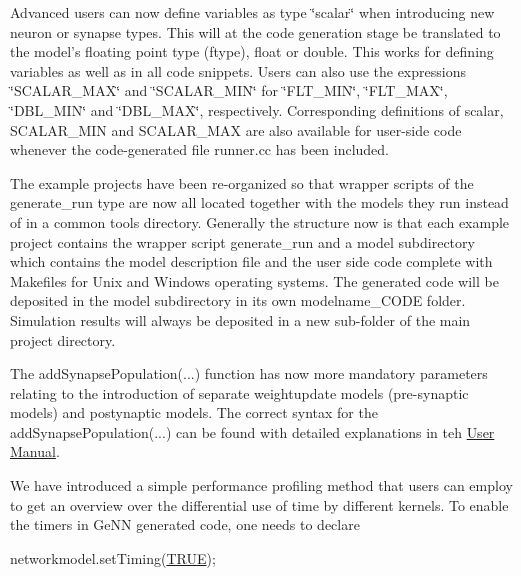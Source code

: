 \begin{DoxyEnumerate}
\item Advanced users can now define variables as type \char`\"{}scalar\char`\"{} when introducing new neuron or synapse types. This will at the code generation stage be translated to the model's floating point type (ftype), {\ttfamily float} or {\ttfamily double}. This works for defining variables as well as in all code snippets. Users can also use the expressions \char`\"{}\+S\+C\+A\+L\+A\+R\+\_\+\+M\+A\+X\char`\"{} and \char`\"{}\+S\+C\+A\+L\+A\+R\+\_\+\+M\+I\+N\char`\"{} for \char`\"{}\+F\+L\+T\+\_\+\+M\+I\+N\char`\"{}, \char`\"{}\+F\+L\+T\+\_\+\+M\+A\+X\char`\"{}, \char`\"{}\+D\+B\+L\+\_\+\+M\+I\+N\char`\"{} and \char`\"{}\+D\+B\+L\+\_\+\+M\+A\+X\char`\"{}, respectively. Corresponding definitions of {\ttfamily scalar}, {\ttfamily S\+C\+A\+L\+A\+R\+\_\+\+M\+I\+N} and {\ttfamily S\+C\+A\+L\+A\+R\+\_\+\+M\+A\+X} are also available for user-\/side code whenever the code-\/generated file {\ttfamily runner.\+cc} has been included.
\item The example projects have been re-\/organized so that wrapper scripts of the {\ttfamily generate\+\_\+run} type are now all located together with the models they run instead of in a common {\ttfamily tools} directory. Generally the structure now is that each example project contains the wrapper script {\ttfamily generate\+\_\+run} and a {\ttfamily model} subdirectory which contains the model description file and the user side code complete with Makefiles for Unix and Windows operating systems. The generated code will be deposited in the {\ttfamily model} subdirectory in its own {\ttfamily modelname\+\_\+\+C\+O\+D\+E} folder. Simulation results will always be deposited in a new sub-\/folder of the main project directory.
\item The {\ttfamily add\+Synapse\+Population(...)} function has now more mandatory parameters relating to the introduction of separate weightupdate models (pre-\/synaptic models) and postynaptic models. The correct syntax for the {\ttfamily add\+Synapse\+Population(...)} can be found with detailed explanations in teh \hyperlink{UserManual}{User Manual}.
\item We have introduced a simple performance profiling method that users can employ to get an overview over the differential use of time by different kernels. To enable the timers in Ge\+N\+N generated code, one needs to declare 
\begin{DoxyCode}
networkmodel.setTiming(\hyperlink{modelSpec_8h_aa8cecfc5c5c054d2875c03e77b7be15d}{TRUE});
\end{DoxyCode}

\end{DoxyEnumerate}
